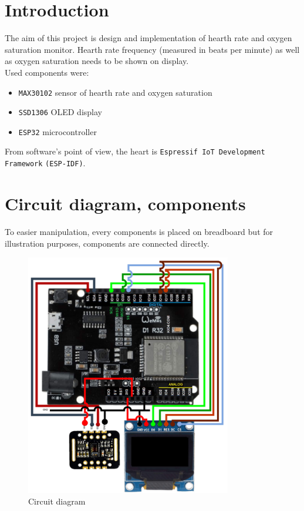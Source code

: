 \chapter{Introduction}
    The aim of this project is design and implementation of hearth rate and oxygen saturation monitor.
    Hearth rate frequency (measured in beats per minute) as well as oxygen saturation needs to be shown on display. \\
    Used components were:
    \begin{itemize}
        \item \texttt{MAX30102} sensor of hearth rate and oxygen saturation \cite{max30102:manual}
        \item \texttt{SSD1306} OLED display \cite{ssd1306:manual}
        \item \texttt{ESP32} microcontroller \cite{ESP:Manual}
    \end{itemize}
    From software's point of view, the heart is \texttt{Espressif IoT Development Framework}\cite{espidf:docs} \texttt{(ESP-IDF)}. 
     
\chapter{Circuit diagram, components}
    To easier manipulation, every components is placed on breadboard but for illustration purposes, components are connected directly.\\
    \begin{figure}[ht!]
    \centering
    \includegraphics[width=90mm]{scheme.jpg}
    \caption{Circuit diagram}
    \end{figure}

